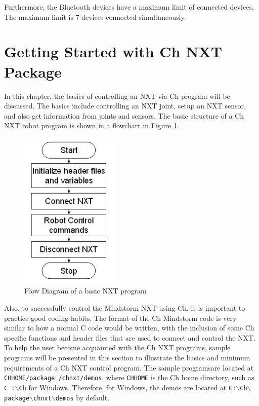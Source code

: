 \documentclass[11pt]{article}
\begin{document}
Furthermore, the Bluetooth devices have a maximum limit of connected devices. The maximum limit is 7 devices connected 
simultaneously.

\newpage
\section{Getting Started with Ch NXT Package}
In this chapter, the basics of controlling an NXT via Ch program will be discussed. The basics include
controlling an NXT joint, setup an NXT sensor, and also get information from joints and sensors. The basic structure 
of a Ch NXT robot program is shown in a flowchart in Figure \ref{fig_NXT_pstruc}.\\
\begin{figure}[h!]
  \begin{center}
    \includegraphics[height=3in]{figure/mindstorm/NXT_pstruc.png}
    \caption{Flow Diagram of a basic NXT program\label{fig_NXT_pstruc}}
  \end{center}
\end{figure}
Also, to successfully control the Mindstorm NXT using Ch, it is important to 
practice good coding habits. The format of the Ch Mindstorm code is very similar 
to how a normal C code would be written, with the inclusion of some Ch specific 
functions and header files that are used to connect and control the NXT. To help 
the user become acquainted with the Ch NXT programs, sample programs will be 
presented in this section to illustrate the basics and minimum requirements of a 
Ch NXT control program. The sample programsare located at {\tt CHHOME/package
/chnxt/demos}, where {\tt CHHOME} is the Ch home directory, such as {\tt C
:$\backslash$Ch} for Windows. Therefore, for Windows, the demos are located at 
{\tt C:$\backslash$Ch$\backslash$package$\backslash$chnxt$\backslash$demos} 
by default.
\end{document}
